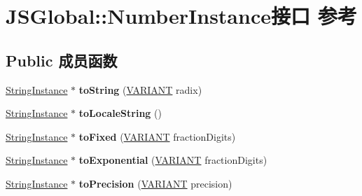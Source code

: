 \hypertarget{interface_j_s_global_1_1_number_instance}{}\section{J\+S\+Global\+:\+:Number\+Instance接口 参考}
\label{interface_j_s_global_1_1_number_instance}
\subsection*{Public 成员函数}
\begin{DoxyCompactItemize}
\item 
\mbox{\label{interface_j_s_global_1_1_number_instance_a5edc18a304a555435dd4ed5482323051}} 
\hyperlink{interface_j_s_global_1_1_string_instance}{String\+Instance} $\ast$ {\bfseries to\+String} (\hyperlink{structtag_v_a_r_i_a_n_t}{V\+A\+R\+I\+A\+NT} radix)
\item 
\mbox{\label{interface_j_s_global_1_1_number_instance_a29356e63531504b6f3c87c0acf1eda53}} 
\hyperlink{interface_j_s_global_1_1_string_instance}{String\+Instance} $\ast$ {\bfseries to\+Locale\+String} ()
\item 
\mbox{\label{interface_j_s_global_1_1_number_instance_a16fa7baa0463ed00b005862b2744c87b}} 
\hyperlink{interface_j_s_global_1_1_string_instance}{String\+Instance} $\ast$ {\bfseries to\+Fixed} (\hyperlink{structtag_v_a_r_i_a_n_t}{V\+A\+R\+I\+A\+NT} fraction\+Digits)
\item 
\mbox{\label{interface_j_s_global_1_1_number_instance_adc3540b3753d87a1440428377cb6e327}} 
\hyperlink{interface_j_s_global_1_1_string_instance}{String\+Instance} $\ast$ {\bfseries to\+Exponential} (\hyperlink{structtag_v_a_r_i_a_n_t}{V\+A\+R\+I\+A\+NT} fraction\+Digits)
\item 
\mbox{\label{interface_j_s_global_1_1_number_instance_a45c2cd180abba4405e13290e232cc6cd}} 
\hyperlink{interface_j_s_global_1_1_string_instance}{String\+Instance} $\ast$ {\bfseries to\+Precision} (\hyperlink{structtag_v_a_r_i_a_n_t}{V\+A\+R\+I\+A\+NT} precision)
\item 

\end{DoxyCompactItemize}

